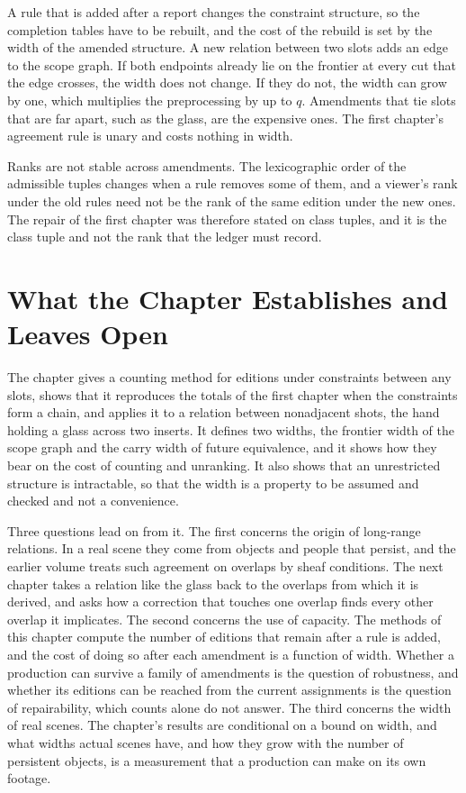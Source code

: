 \documentclass[11pt,twoside,openright]{book}
\theoremstyle{plain}
\theoremstyle{definition}
\theoremstyle{remark}
\begin{document}
A rule that is added after a report changes the constraint structure, so the completion tables have to be rebuilt, and the cost of the rebuild is set by the width of the amended structure. A new relation between two slots adds an edge to the scope graph. If both endpoints already lie on the frontier at every cut that the edge crosses, the width does not change. If they do not, the width can grow by one, which multiplies the preprocessing by up to $q$. Amendments that tie slots that are far apart, such as the glass, are the expensive ones. The first chapter's agreement rule is unary and costs nothing in width.

Ranks are not stable across amendments. The lexicographic order of the admissible tuples changes when a rule removes some of them, and a viewer's rank under the old rules need not be the rank of the same edition under the new ones. The repair of the first chapter was therefore stated on class tuples, and it is the class tuple and not the rank that the ledger must record.

\section{What the Chapter Establishes and Leaves Open}\label{sec:chapter-end}

The chapter gives a counting method for editions under constraints between any slots, shows that it reproduces the totals of the first chapter when the constraints form a chain, and applies it to a relation between nonadjacent shots, the hand holding a glass across two inserts. It defines two widths, the frontier width of the scope graph and the carry width of future equivalence, and it shows how they bear on the cost of counting and unranking. It also shows that an unrestricted structure is intractable, so that the width is a property to be assumed and checked and not a convenience.

Three questions lead on from it. The first concerns the origin of long-range relations. In a real scene they come from objects and people that persist, and the earlier volume treats such agreement on overlaps by sheaf conditions. The next chapter takes a relation like the glass back to the overlaps from which it is derived, and asks how a correction that touches one overlap finds every other overlap it implicates. The second concerns the use of capacity. The methods of this chapter compute the number of editions that remain after a rule is added, and the cost of doing so after each amendment is a function of width. Whether a production can survive a family of amendments is the question of robustness, and whether its editions can be reached from the current assignments is the question of repairability, which counts alone do not answer. The third concerns the width of real scenes. The chapter's results are conditional on a bound on width, and what widths actual scenes have, and how they grow with the number of persistent objects, is a measurement that a production can make on its own footage.
\end{document}
